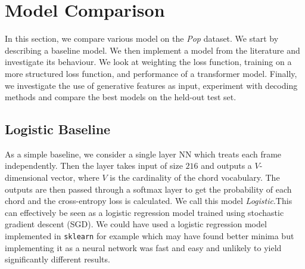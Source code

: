 \chapter{Model Comparison}

In this section, we compare various model on the \emph{Pop} dataset. We start by describing a baseline model. We then implement a model from the literature and investigate its behaviour. We look at weighting the loss function, training on a more structured loss function, and performance of a transformer model. Finally, we investigate the use of generative features as input, experiment with decoding methods and compare the best models on the held-out test set.

\section{Logistic Baseline}

As a simple baseline, we consider a single layer NN which treats each frame independently. Then the layer takes input of size $216$ and outputs a $V$-dimensional vector, where $V$ is the cardinality of the chord vocabulary. The outputs are then passed through a softmax layer to get the probability of each chord and the cross-entropy loss is calculated. We call this model \emph{Logistic}.This can effectively be seen as a logistic regression model trained using stochastic gradient descent (SGD). We could have used a logistic regression model implemented in \texttt{sklearn} for example which may have found better minima but implementing it as a neural network was fast and easy and unlikely to yield significantly different results.

